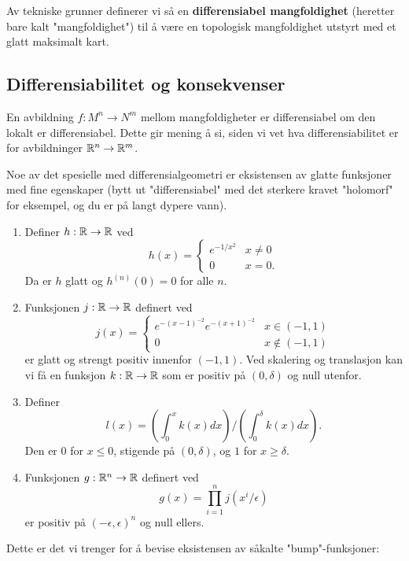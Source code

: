 \documentclass[11pt, english]{article}
\begin{document}
Av tekniske grunner definerer vi så en \textbf{differensiabel mangfoldighet} (heretter bare kalt "mangfoldighet") til å være en topologisk mangfoldighet utstyrt med et glatt maksimalt kart. 

\subsection{Differensiabilitet og konsekvenser}

En avbildning $f:M^n \to N^m$ mellom mangfoldigheter er differensiabel om den lokalt er differensiabel. Dette gir mening å si, siden vi vet hva differensiabilitet er for avbildninger $\mathbb{R}^n \to \mathbb{R}^m$. 

Noe av det spesielle med differensialgeometri er eksistensen av glatte funksjoner med fine egenskaper (bytt ut "differensiabel" med det sterkere kravet "holomorf" for eksempel, og du er på langt dypere vann). 

\begin{enumerate}
\item Definer $h:\mathbb{R} \to \mathbb{R}$ ved 
\[
h(x) = \begin{cases} e^{-1/x^2} & x \neq 0 \\
0 & x=0.
\end{cases}
\]
Da er $h$ glatt og $h^{(n)}(0)=0$ for alle $n$.
\item Funksjonen $j:\mathbb{R} \to \mathbb{R}$ definert ved
$$
j(x) = \begin{cases} e^{-(x-1)^{-2}}e^{-(x+1)^{-2}} & x \in (-1,1) \\
0 & x \not \in (-1,1)
\end{cases}
$$
er glatt og strengt positiv innenfor $(-1,1)$. Ved skalering og translasjon kan vi få en funksjon $k:\mathbb{R} \to \mathbb{R}$ som er positiv på $(0,\delta)$ og null utenfor.
\item Definer 
$$
l(x) = \left( \int_0^x k(x) dx \right) / \left( \int_0^\delta k(x) dx \right). 
$$
Den er $0$ for $x \leq 0$, stigende på $(0,\delta)$, og $1$ for $x \geq \delta$.
\item Funksjonen $g:\mathbb{R}^n \to \mathbb{R}$ definert ved
$$
g(x) = \prod_{i=1}^n j(x^i/\epsilon)
$$
er positiv på $(-\epsilon, \epsilon)^n$ og null ellers.
\end{enumerate}

Dette er det vi trenger for å bevise eksistensen av såkalte "bump"-funksjoner:
\end{document}
